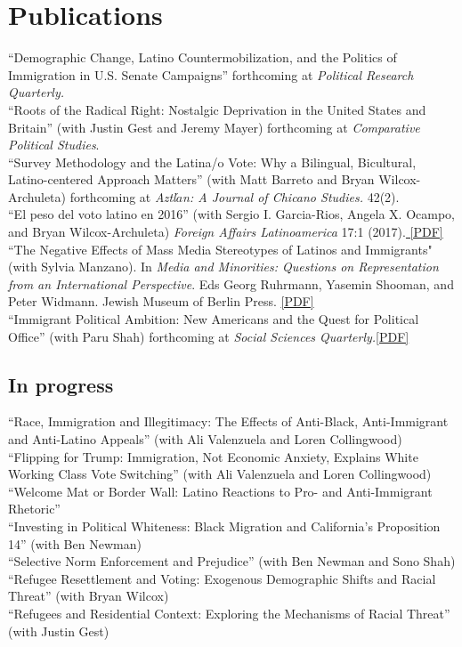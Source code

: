 \documentclass[11pt, a4paper]{article}
\newcommand{\years}[1]{\marginnote{\scriptsize #1}}
\begin{document}
\section*{Publications}
\years{2017}``Demographic Change, Latino Countermobilization, and the Politics of Immigration in U.S. Senate Campaigns'' forthcoming at \textit{Political Research Quarterly.}\\
\years{2017}``Roots of the Radical Right: Nostalgic Deprivation in the United States and Britain'' (with Justin Gest and Jeremy Mayer) forthcoming at \textit{Comparative Political Studies}.\\
\years{2017} ``Survey Methodology and the Latina/o Vote: Why a Bilingual, Bicultural, Latino-centered Approach Matters'' (with Matt Barreto and Bryan Wilcox-Archuleta) forthcoming at \textit{Aztl$\acute{a}$n: A Journal of Chicano Studies.} 42(2).\\
\years{2017} ``El peso del voto latino en 2016'' (with Sergio I. Garcia-Rios, Angela X. Ocampo, and Bryan Wilcox-Archuleta) \textit{Foreign Affairs Latinoamerica} 17:1 (2017).\href{https://media.wix.com/ugd/07c246_74b2c2e48a1c4486b83bd7fd908b1625.pdf}{ [PDF]}\\
\years{2016} ``The Negative Effects of Mass Media Stereotypes of Latinos and Immigrants" (with Sylvia Manzano). In \textit{Media and Minorities: Questions on Representation from an International Perspective}. Eds Georg Ruhrmann, Yasemin Shooman, and Peter Widmann. Jewish Museum of Berlin Press. \href{http://tylerreny.github.io/pdf/pubs/reny_manzano_stereotypes_2016.pdf}{[PDF]}\\
\years{2016} ``Immigrant Political Ambition:  New Americans and the Quest for Political Office'' (with Paru Shah) forthcoming at \textit{Social Sciences Quarterly.}\href{https://www.dropbox.com/s/monmlmhaaowg5vp/Immigrant%20Political%20Ambition%20SSQ%20Final.pdf?dl=0}{[PDF]}\\

\subsection*{In progress}

\years{}``Race, Immigration and Illegitimacy: The Effects of Anti-Black, Anti-Immigrant and Anti-Latino Appeals'' (with Ali Valenzuela and Loren Collingwood)\\
\years{}``Flipping for Trump: Immigration, Not Economic Anxiety, Explains White
Working Class Vote Switching'' (with Ali Valenzuela and Loren Collingwood)\\
\years{}``Welcome Mat or Border Wall: Latino Reactions to Pro- and Anti-Immigrant Rhetoric''\\
\years{}``Investing in Political Whiteness: Black Migration and California's Proposition 14'' (with Ben Newman)\\
\years{}``Selective Norm Enforcement and Prejudice'' (with Ben Newman and Sono Shah)\\
\years{}``Refugee Resettlement and Voting: Exogenous Demographic Shifts and Racial Threat'' (with Bryan Wilcox)\\
\years{}``Refugees and Residential Context: Exploring the Mechanisms of Racial Threat'' (with Justin Gest)\\
\end{document}

